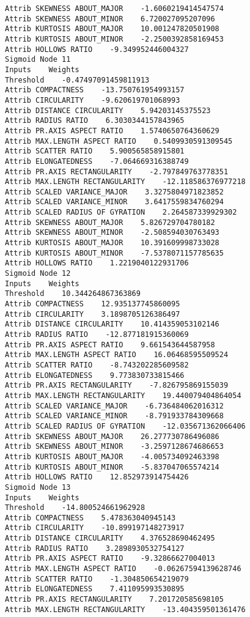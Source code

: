 \documentclass[
	article,			%
	11pt,				%
	oneside,			%
	a4paper,			%
	english,			%
	brazil,				%
	sumario=tradicional
	]{abntex2}
\begin{document}
\begin{lstlisting}
Attrib SKEWNESS ABOUT_MAJOR    -1.6060219414547574
Attrib SKEWNESS ABOUT_MINOR    6.720027095207096
Attrib KURTOSIS ABOUT_MAJOR    10.001247820501908
Attrib KURTOSIS ABOUT_MINOR    -2.2500392858169453
Attrib HOLLOWS RATIO    -9.349952446004327
Sigmoid Node 11
Inputs    Weights
Threshold    -0.47497091459811913
Attrib COMPACTNESS    -13.750761954993157
Attrib CIRCULARITY    -9.620619701068993
Attrib DISTANCE CIRCULARITY    5.94203145375523
Attrib RADIUS RATIO    6.3030344157843965
Attrib PR.AXIS ASPECT RATIO    1.5740650764360629
Attrib MAX.LENGTH ASPECT RATIO    0.5409930591309545
Attrib SCATTER RATIO    5.900565858915801
Attrib ELONGATEDNESS    -7.064669316388749
Attrib PR.AXIS RECTANGULARITY    -2.797849763778351
Attrib MAX.LENGTH RECTANGULARITY    -12.118586376977218
Attrib SCALED VARIANCE_MAJOR    3.3275804971823852
Attrib SCALED VARIANCE_MINOR    3.6417559834760294
Attrib SCALED RADIUS OF GYRATION    2.264587339929302
Attrib SKEWNESS ABOUT_MAJOR    5.826729704780182
Attrib SKEWNESS ABOUT_MINOR    -2.508594030763493
Attrib KURTOSIS ABOUT_MAJOR    10.391609998733028
Attrib KURTOSIS ABOUT_MINOR    -7.5378071157785635
Attrib HOLLOWS RATIO    1.2219040122931706
Sigmoid Node 12
Inputs    Weights
Threshold    10.344264867363869
Attrib COMPACTNESS    12.935137745860095
Attrib CIRCULARITY    3.1898705126386497
Attrib DISTANCE CIRCULARITY    10.414359053102146
Attrib RADIUS RATIO    -12.877181915360069
Attrib PR.AXIS ASPECT RATIO    9.661543644587958
Attrib MAX.LENGTH ASPECT RATIO    16.06468595509524
Attrib SCATTER RATIO    -8.743202285609582
Attrib ELONGATEDNESS    9.773830733815466
Attrib PR.AXIS RECTANGULARITY    -7.826795869155039
Attrib MAX.LENGTH RECTANGULARITY    19.440079404864054
Attrib SCALED VARIANCE_MAJOR    -6.736484062016312
Attrib SCALED VARIANCE_MINOR    -8.791933784309668
Attrib SCALED RADIUS OF GYRATION    -12.035671362066406
Attrib SKEWNESS ABOUT_MAJOR    26.277730786496086
Attrib SKEWNESS ABOUT_MINOR    -3.2597128674686653
Attrib KURTOSIS ABOUT_MAJOR    -4.005734092463398
Attrib KURTOSIS ABOUT_MINOR    -5.837047065574214
Attrib HOLLOWS RATIO    12.852973914754426
Sigmoid Node 13
Inputs    Weights
Threshold    -14.800524661962928
Attrib COMPACTNESS    5.478363040945143
Attrib CIRCULARITY    -10.899197148273917
Attrib DISTANCE CIRCULARITY    4.376528690462495
Attrib RADIUS RATIO    3.2898930532754127
Attrib PR.AXIS ASPECT RATIO    -9.32866627004013
Attrib MAX.LENGTH ASPECT RATIO    -0.06267594139628746
Attrib SCATTER RATIO    -1.304850654219079
Attrib ELONGATEDNESS    7.411095993530895
Attrib PR.AXIS RECTANGULARITY    7.201720585698105
Attrib MAX.LENGTH RECTANGULARITY    -13.404359501361476

\end{lstlisting}
\end{document}
